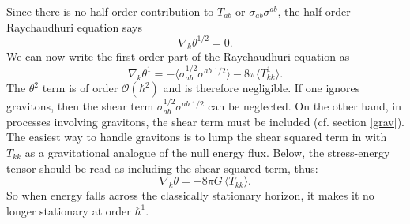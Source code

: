 \documentclass{article}
\begin{document}
Since there is no half-order contribution to $T_{ab}$ or $\sigma_{ab}\sigma^{ab}$, the half order Raychaudhuri equation says
\begin{equation}\label{Rayhalf}
\nabla_k \theta^{1/2} = 0.
\end{equation}
We can now write the first order part of the Raychaudhuri equation as
\begin{equation}\label{Ray1}
\nabla_k \theta^1 = - \langle \sigma_{ab}^{1/2}\sigma^{ab\phantom{i}{1/2}} \rangle - 8\pi \langle T_{kk}^{1} \rangle.
\end{equation}
The $\theta^2$ term is of order $\mathcal{O}(\hbar^{2})$ and is therefore negligible.  If one ignores gravitons, then the shear term $\sigma_{ab}^{1/2}\sigma^{ab\phantom{i}{1/2}}$ can be neglected.  On the other hand, in processes involving gravitons, the shear term must be included (cf. section \ref{grav}).  The easiest way to handle gravitons is to lump the shear squared term in with $T_{kk}$ as a gravitational analogue of the null energy flux.  Below, the stress-energy tensor should be read as including the shear-squared term, thus:
\begin{equation}\label{linRay}
\nabla_k \theta = -8\pi G\,\langle T_{kk} \rangle.
\end{equation}
So when energy falls across the classically stationary horizon, it makes it no longer stationary at order $\hbar^1$.
\end{document}
